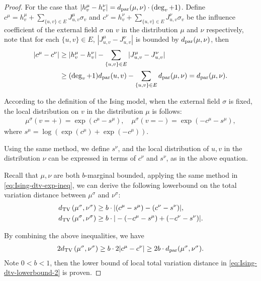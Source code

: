 \begin{proof}
For the case that $|h_v^\mu-h_v^\nu|=d_\mathrm{par}(\mu,\nu) \cdot (\deg_v+1)$. Define $c^\mu=h^\mu_v+\sum_{\{u,v\}\in E}J^\mu_{u,v}\sigma_v$ and $c^\nu=h^\nu_v+\sum_{\{u,v\}\in E}J^\nu_{u,v}\sigma_v$ be the influence
coefficient of the external field $\sigma$ on $v$ in the distribution $\mu$ and $\nu$ respectively, note that for each $\{u,v\}\in E$, $|J^\mu_{u,v}-J^\nu_{u,v}|$ is bounded by $d_\mathrm{par}(\mu,\nu)$, then 
\begin{align*}
|c^\mu-c^\nu| &\geq |h^\mu_v-h^\nu_v|-\sum_{\{u,v\}\in E}|J^\mu_{u,v}-J^\nu_{u,v}| \\&\geq (\deg_v+1)d_\mathrm{par}(u,v)- \sum_{\{u,v\}\in E}d_\mathrm{par}(\mu,\nu) = d_\mathrm{par}(\mu,\nu).
\end{align*}


According to the definition of the Ising model, when the external field $\sigma$ is fixed, the local distribution on $v$ in the distribution $\mu$ is follows:
\begin{align*}
    \mu^\sigma(v=+) = \exp(c^\mu-s^\mu), \quad \mu^\sigma(v=-) = \exp(-c^\mu-s^\mu),
\end{align*}
where $s^\mu = \log (\exp(c^\mu)+\exp(-c^\mu))$. 

Using the same method, we define $s^\nu$, and the local distribution of $u,v$ in the distribution $\nu$ can be expressed in terms of $c^\nu$ and $s^\nu$, as in the above equation. 

Recall that $\mu,\nu$ are both $b$-marginal bounded, applying the same method in \eqref{eq:Ising-dtv-exp-ineq}, we can derive the following lowerbound on the total variation distance between $\mu^\sigma$ and $\nu^\sigma$:
\begin{align}
\label{eq:Ising-dtv-local-vertex-1}
d_{\mathrm{TV}}\left({\mu^\sigma},{\nu^\sigma}\right) &\geq b \cdot |(c^\mu-s^\mu)-(c^\nu-s^\nu)|,
\\
\label{eq:Ising-dtv-local-vertex-2}
d_{\mathrm{TV}}\left({\mu^\sigma},{\nu^\sigma}\right) &\geq b \cdot |-(-c^\mu-s^\mu)+(-c^\nu-s^\nu)|.
\end{align}

By combining the above inequalities, we have 
\begin{align*}
2d_{\mathrm{TV}}\left({\mu^\sigma},{\nu^\sigma}\right) \geq b \cdot 2|c^\mu-c^\nu| \geq 2b\cdot d_\mathrm{par}(\mu^\sigma,\nu^\sigma).
\end{align*}
Note $0<b<1$, then the lower bound of local total variation distance in \eqref{eq:Ising-dtv-lowerbound-2} is proven.
\end{proof}

